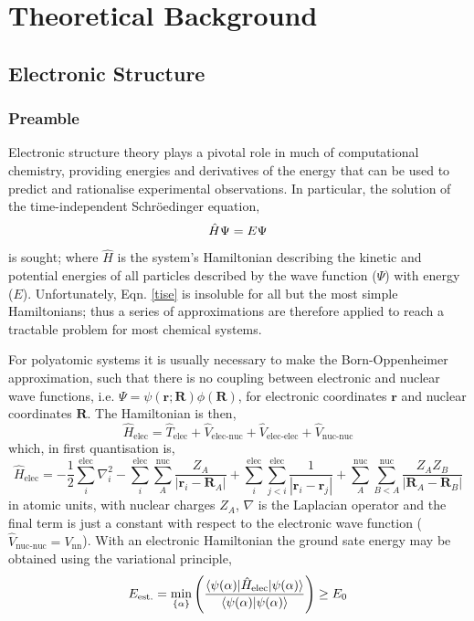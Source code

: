 \documentclass[main.tex]{subfiles}
\begin{document}
\setcounter{footnote}{0} 

\chapter{Theoretical Background}

\section{Electronic Structure}
\subsection{Preamble}
Electronic structure theory plays a pivotal role in much of computational chemistry, providing energies and derivatives of the energy that can be used to predict and rationalise experimental observations. In particular, the solution of the time-independent Schr\"{o}edinger equation,
\begin{equation}
\hat{H} \Psi  = E \Psi
\label{tise}
\vspace{-0.3cm}
\end{equation}
is sought; where $\hat{H}$ is the system's Hamiltonian describing the kinetic and potential energies of all particles described by the wave function ($\Psi$) with  energy ($E$). Unfortunately, Eqn. \eqref{tise} is insoluble for all but the most simple Hamiltonians; thus a series of approximations are therefore applied to reach a tractable problem for most chemical systems.

For polyatomic systems it is usually necessary to make the Born-Oppenheimer approximation, such that there is no coupling between electronic and nuclear wave functions, i.e. $\Psi = \psi(\boldsymbol{r}; \boldsymbol{R})\phi(\boldsymbol{R})$, for electronic coordinates $\boldsymbol{r}$ and nuclear coordinates $\boldsymbol{R}$. The Hamiltonian is then,
\begin{equation}
\hat{H}_\text{elec} = \hat{T}_\text{elec} + \hat{V}_\text{elec-nuc} + \hat{V}_\text{elec-elec} +  \hat{V}_\text{nuc-nuc}
\end{equation}
which, in first quantisation is,
\begin{equation}
\hat{H}_\text{elec} = -\frac{1}{2}\sum_{i}^\text{elec} \nabla^2_i  - \sum_{i}^\text{elec}\sum_A^\text{nuc}\frac{Z_A}{|\boldsymbol{r}_i - \boldsymbol{R}_A|} +  \sum_{i}^\text{elec}\sum_{j < i}^\text{elec} \frac{1}{|\boldsymbol{r}_i - \boldsymbol{r}_j|} + \sum_{A}^\text{nuc}\sum_{B < A}^\text{nuc} \frac{Z_A Z_B}{|\boldsymbol{R}_A - \boldsymbol{R}_B|}
\label{H_elec}
\end{equation}
 in atomic units, with nuclear charges $Z_A$, $\nabla$ is the Laplacian operator and the final term is just a constant with respect to the electronic wave function ($\hat{V}_\text{nuc-nuc} = V_\text{nn}$). With an electronic Hamiltonian the ground sate energy may be obtained using the variational principle,
 \begin{equation}
 	E_\text{est.} = \min_{\{\alpha\}}\left(\frac{\braket{\psi(\alpha) | \hat{H}_\text{elec}| \psi(\alpha)}}{\braket{\psi(\alpha)| \psi(\alpha)}}\right) \ge E_0
 \end{equation}
 
\end{document}
